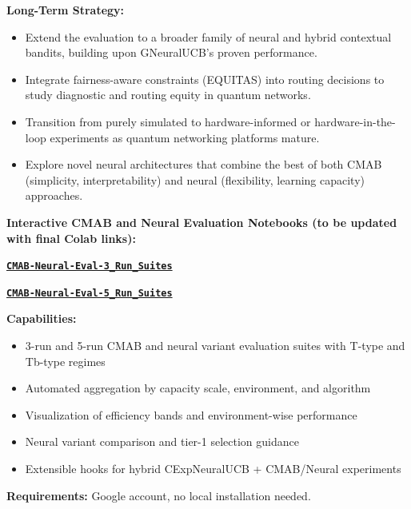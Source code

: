 \documentclass[12pt,a4paper]{article}
\newcommand{\colab}[1]{\textcolor{colabcolor}{\textbf{#1}}}
\begin{document}
\textbf{Long-Term Strategy:}
\begin{itemize}
\item Extend the evaluation to a broader family of neural and hybrid contextual bandits, building upon GNeuralUCB's proven performance.
\item Integrate fairness-aware constraints (EQUITAS) into routing decisions to study diagnostic and routing equity in quantum networks.
\item Transition from purely simulated to hardware-informed or hardware-in-the-loop experiments as quantum networking platforms mature.
\item Explore novel neural architectures that combine the best of both CMAB (simplicity, interpretability) and neural (flexibility, learning capacity) approaches.
\end{itemize}

\begin{tcolorbox}[colback=colabcolor!20,colframe=colabcolor,title=\textbf{Interactive Framework Access (Placeholder Links)}]

\begin{center}
\textbf{Interactive CMAB and Neural Evaluation Notebooks (to be updated with final Colab links):}
\vspace{0.3cm}

\href{https://colab.research.google.com/drive/PLACEHOLDER_3_RUNS}{\colab{\texttt{CMAB-Neural-Eval-3\_Run\_Suites}}}

\href{https://colab.research.google.com/drive/PLACEHOLDER_5_RUNS}{\colab{\texttt{CMAB-Neural-Eval-5\_Run\_Suites}}}

\vspace{0.3cm}
\textbf{Capabilities:}
\begin{itemize}
\item 3-run and 5-run CMAB and neural variant evaluation suites with T-type and Tb-type regimes
\item Automated aggregation by capacity scale, environment, and algorithm
\item Visualization of efficiency bands and environment-wise performance
\item Neural variant comparison and tier-1 selection guidance
\item Extensible hooks for hybrid CExpNeuralUCB + CMAB/Neural experiments
\end{itemize}

\textbf{Requirements:} Google account, no local installation needed.
\end{center}
\end{tcolorbox}
\end{document}
